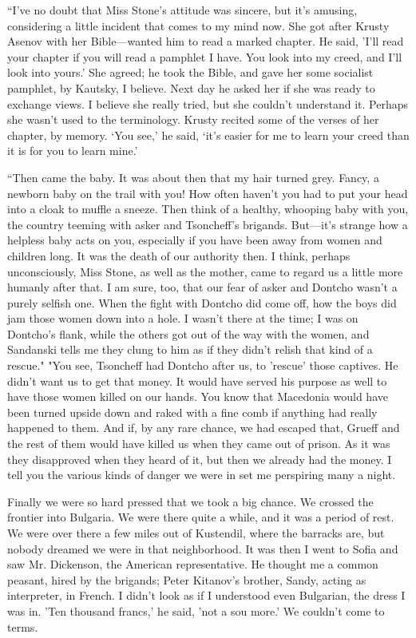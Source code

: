 \documentclass[a5paper,12pt]{book}
\begin{document}
“I’ve no doubt that Miss Stone’s attitude was sincere, but it’s amusing, considering a little incident that comes to my mind now. She got after Krusty Asenov with her Bible—wanted him to read a marked chapter. He said, 'I'll read your chapter if you will read a pamphlet I have. You look into my creed, and I’ll look into yours.' She agreed; he took the Bible, and gave her some socialist pamphlet, by Kautsky, I believe. Next day he asked her if she was ready to exchange views. I believe she really tried, but she couldn’t understand it. Perhaps she wasn’t used to the terminology. Krusty recited some of the verses of her chapter, by memory. ‘You see,' he said, ‘it’s easier for me to learn your creed than it is for you to learn mine.'

“Then came the baby. It was about then that my hair turned grey. Fancy, a newborn baby on the trail with you! How often haven’t you had to put your head into a cloak to muffle a sneeze. Then think of a healthy, whooping baby with you, the country teeming with asker and Tsoncheff’s brigands. But—it’s strange how a helpless baby acts on you, especially if you have been away from women and children long. It was the death of our authority then. I think, perhaps unconsciously, Miss Stone, as well as the mother, came to regard us a little more humanly after that. I am sure, too, that our fear of asker and Dontcho wasn’t a purely selfish one. When the fight with Dontcho did come off, how the boys did jam those women down into a hole. I wasn’t there at the time; I was on Dontcho’s flank, while the others got out of the way with the women, and Sandanski tells me they clung to him as if they didn’t relish that kind of a rescue."
"You see, Tsoncheff had Dontcho after us, to 'rescue’ those captives. He didn’t want us to get that money. It would have served his purpose as well to have those women killed on our hands. You know that Macedonia would have been turned upside down and raked with a fine comb if anything had really happened to them. And if, by any rare chance, we had escaped that, Grueff and the rest of them would have killed us when they came out of prison. As it was they disapproved when they heard of it, but then we already had the money. I tell you the various kinds of danger we were in set me perspiring many a night.

Finally we were so hard pressed that we took a big chance. We crossed the frontier into Bulgaria. We were there quite a while, and it was a period of rest. We were over there a few miles out of Kustendil, where the barracks are, but nobody dreamed we were in that neighborhood. It was then I went to Sofia and saw Mr. Dickenson, the American representative. He thought me a common peasant, hired by the brigands; Peter Kitanov’s brother, Sandy, acting as interpreter, in French. I didn’t look as if I understood even Bulgarian, the dress I was in. 'Ten thousand francs,’ he said, 'not a sou more.’ We couldn’t come to terms.
\end{document}
